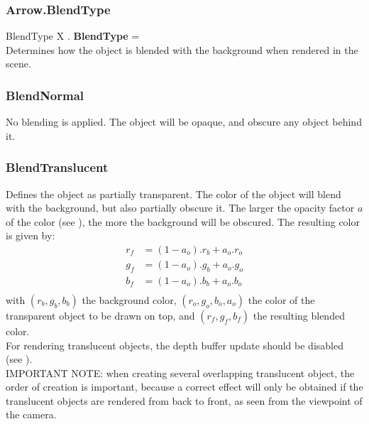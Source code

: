 \subsubsection{Arrow.BlendType \label{F:Arrow:BlendType}}
BlendType X . \textbf{BlendType} = \\
Determines how the object is blended with the background when rendered in the scene.

\subsubsection{BlendNormal \label{T:BlendType|BlendNormal}}
No blending is applied. The object will be opaque, and obscure any object behind it.

\subsubsection{BlendTranslucent \label{T:BlendType|BlendTranslucent}}
Defines the object as partially transparent. The color of the object will blend with the background, but also partially obscure it. The larger the opacity factor $a$ of the color (see ), the more the background will be obscured. The resulting color is given by:
\begin{equation}
\begin{array}{rcl}
r_f & = (1-a_o) . r_b + a_o . r_o \\
g_f & = (1-a_o) . g_b + a_o . g_o \\
b_f & = (1-a_o) . b_b + a_o . b_o \\
\end{array}
\end{equation}
with $(r_b,g_b,b_b)$ the background color, $(r_o,g_o,b_o,a_o)$ the color of the transparent object to be drawn on top, and $(r_f,g_f,b_f)$ the resulting blended color. \\
For rendering translucent objects, the depth buffer update should be disabled (see ). \\
IMPORTANT NOTE: when creating several overlapping translucent object, the order of creation is important, because a correct effect will only be obtained if the translucent objects are rendered from back to front, as seen from the viewpoint of the camera.

